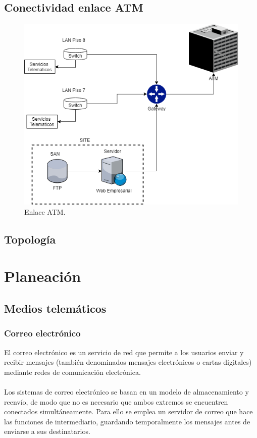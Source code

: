 \documentclass[12pt,letterpaper]{article}
\begin{document}
\subsection{Conectividad enlace ATM}
\begin{figure}[ht]
    \centering
    \includegraphics[width=.9\textwidth]{imagenes/atmdia.png}
    \caption{Enlace ATM.}
\end{figure}

\newpage
\subsection{Topología}


\newpage
\section{Planeación}
\subsection{Medios telemáticos}
\subsubsection{Correo electrónico}
El correo electrónico es un servicio de red que permite a los usuarios enviar y recibir 
mensajes (también denominados mensajes electrónicos o cartas digitales) mediante redes de 
comunicación electrónica.
\\ \\
Los sistemas de correo electrónico se basan en un modelo de almacenamiento y reenvío, de 
modo que no es necesario que ambos extremos se encuentren conectados simultáneamente. 
Para ello se emplea un servidor de correo que hace las funciones de intermediario, guardando 
temporalmente los mensajes antes de enviarse a sus destinatarios. \cite{email}
\end{document}
